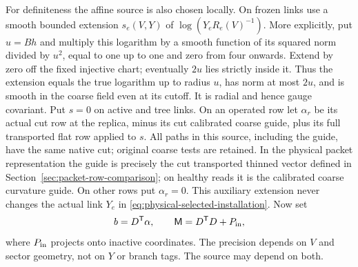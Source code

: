 \documentclass[11pt,reqno]{amsart}
\numberwithin{equation}{section}
\theoremstyle{definition}
\theoremstyle{remark}
\begin{document}
For definiteness the affine source is also chosen locally.
On frozen links use a smooth bounded extension \(s_e(V,Y)\)
of \(\log(Y_eR_e(V)^{-1})\). More explicitly, put \(u=Bh\)
and multiply this logarithm by a smooth function of its squared
norm divided by \(u^2\), equal to one up to one and zero from
four onwards. Extend by zero off the fixed injective chart;
eventually \(2u\) lies strictly inside it. Thus the extension
equals the true logarithm up to radius \(u\), has norm at most
\(2u\), and is smooth in the coarse field even at its cutoff.
It is radial and hence gauge covariant. Put \(s=0\) on active
and tree links.
On an operated row let \(\alpha_r\) be its actual cut row at
the replica, minus its cut calibrated coarse guide, plus its
full transported flat row applied to \(s\). All paths in this
source, including the guide, have the same native cut; original
coarse tests are retained. In the physical packet representation
the guide is precisely the cut transported thinned vector
defined in Section~\ref{sec:packet-row-comparison}; on healthy
reads it is the calibrated coarse curvature guide. On other rows put \(\alpha_r=0\).
This auxiliary extension never changes the actual link \(Y_e\)
in \eqref{eq:physical-selected-installation}. Now set
\begin{equation}
 b=D^{\mathsf T}\alpha,\qquad \mathsf M=D^{\mathsf T}D+P_{\rm in},
 \label{eq:physical-selected-precision}
\end{equation}
where \(P_{\rm in}\) projects onto inactive coordinates.
The precision depends on \(V\) and sector geometry, not on
\(Y\) or branch tags. The source may depend on both.
\end{document}
